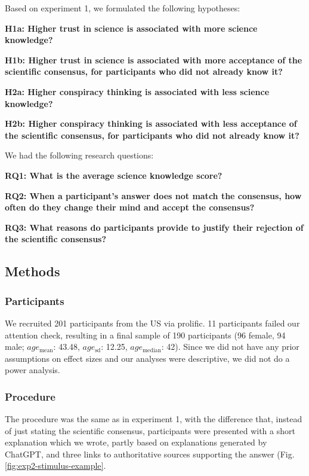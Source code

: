 \documentclass[
  doc,floatsintext]{apa6}
\begin{document}
Based on experiment 1, we formulated the following hypotheses:

\textbf{H1a: Higher trust in science is associated with more science knowledge?}

\textbf{H1b: Higher trust in science is associated with more acceptance of the scientific consensus, for participants who did not already know it?}

\textbf{H2a: Higher conspiracy thinking is associated with less science knowledge?}

\textbf{H2b: Higher conspiracy thinking is associated with less acceptance of the scientific consensus, for participants who did not already know it?}

We had the following research questions:

\textbf{RQ1: What is the average science knowledge score?}

\textbf{RQ2: When a participant's answer does not match the consensus, how often do they change their mind and accept the consensus?}

\textbf{RQ3: What reasons do participants provide to justify their rejection of the scientific consensus?}

\subsection{Methods}\label{methods-1}

\subsubsection{Participants}\label{participants-1}

We recruited 201 participants from the US via prolific. 11 participants failed our attention check, resulting in a final sample of 190 participants (96 female, 94 male; \(age_\text{mean}\): 43.48, \(age_\text{sd}\): 12.25, \(age_\text{median}\): 42). Since we did not have any prior assumptions on effect sizes and our analyses were descriptive, we did not do a power analysis.

\subsubsection{Procedure}\label{procedure-1}

The procedure was the same as in experiment 1, with the difference that, instead of just stating the scientific consensus, participants were presented with a short explanation which we wrote, partly based on explanations generated by ChatGPT, and three links to authoritative sources supporting the answer (Fig. \ref{fig:exp2-stimulus-example}.
\end{document}
